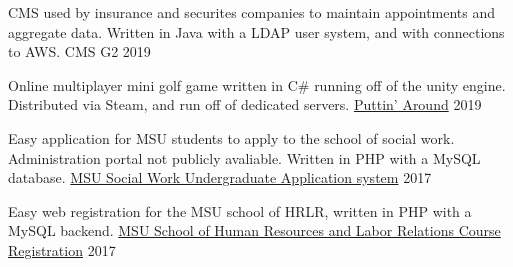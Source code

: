 
\begin{cventries}
  \cventry
    {CMS used by insurance and securites companies to maintain appointments and aggregate data.
    Written in Java with a LDAP user system, and with connections to AWS.}
    {CMS G2}
    {}
    {2019}
    {
    }

  \cventry
    {Online multiplayer mini golf game written in C\# running off of the unity engine. Distributed via Steam,
    and run off of dedicated servers.}
    {\href{https://store.steampowered.com/app/1002650/Puttin_Around/}{Puttin' Around}}
    {}
    {2019}
    {
    }

    \cventry
    {Easy application for MSU students to apply to the school of social work. Administration portal not publicly avaliable.
    Written in PHP with a MySQL database.}
    {\href{https://swdb.socialwork.msu.edu/basw/}{MSU Social Work Undergraduate Application system}}
    {}
    {2017}
    {
    }

    \cventry
    {Easy web registration for the MSU school of HRLR, written in PHP with a MySQL backend. }
    {\href{https://hrlr.msu.edu/registration/login.php}{MSU School of Human Resources and Labor Relations Course Registration}}
    {}
    {2017}
    {
    }

\end{cventries}

